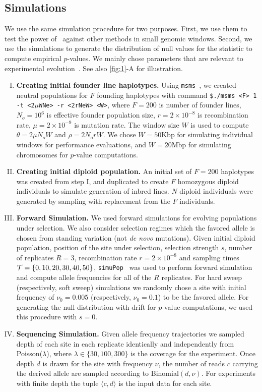 \subsection{Simulations}\label{sec:sims}
We use the same simulation procedure for two purposes. First, we use
them to test the power of \comale\ against other methods in small
genomic windows. Second, we use the simulations to generate the
distribution of null values for the statistic to compute empirical
$p$-values. We mainly chose parameters that are relevant to \dmel
experimental evolution~\cite{kofler2013guide}. See also \ref{fig:1}-A
for illustration. 
\begin{enumerate}[I.]
\item {\bf Creating initial founder line haplotypes.} Using
  \texttt{msms}~\cite{ewing2010msms}, we created neutral populations
  for $F$ founding haplotypes with command \texttt{\$./msms <F> 1 -t
    <2$\mu$WNe> -r <2rNeW> <W>}, where $F=200$ is number of founder
  lines, $N_o=10^6$ is effective founder population size,
  $r=2\times10^{-8}$ is recombination rate, $\mu=2\times 10^{-9}$ is
  mutation rate. The window size $W$ is used to compute $\theta=2\mu
  N_oW$ and $\rho=2N_orW$. We chose $W=50$Kbp for simulating
  individual windows for performance evaluations, and $W=20$Mbp for
  simulating \dmel chromosomes for $p$-value computations.
  
\item{\bf Creating initial diploid population.} An initial set of
  $F=200$ haplotypes was created from step I, and duplicated to create
  $F$ homozygous diploid individuals to simulate generation of inbred
  lines. $N$ diploid individuals were generated by sampling with
  replacement from the $F$ individuals.

\item{\bf Forward Simulation.} We used forward simulations for
  evolving populations under selection. We also consider selection
  regimes which the favored allele is chosen from standing variation
  (not \emph{de novo} mutations). Given initial diploid population,
  position of the site under selection, selection strength $s$, number
  of replicates $R=3$, recombination rate $r=2\times10^{-8}$ and
  sampling times ${\cal T}=\{0,10,20,30,40,50\}$,
  \texttt{simuPop}~\cite{peng2005simupop} was used to perform forward
  simulation and compute allele frequencies for all of the $R$
  replicates.  For hard sweep (respectively, soft sweep) simulations
  we randomly chose a site with initial frequency of $\nu_0=0.005$
  (respectively, $\nu_0=0.1$) to be the favored allele. For generating
  the null distribution with drift for $p$-value computations, we used
  this procedure with $s=0$.

\item{\bf Sequencing Simulation.} Given allele frequency trajectories
  we sampled depth of each site in each replicate identically and
  independently from Poisson($\lambda$), where $\lambda \in
  \{30,100,300\}$ is the coverage for the experiment. Once depth $d$
  is drawn for the site with frequency $\nu$, the number of reads $c$
  carrying the derived allele are sampled according to
  Binomial$(d,\nu)$. For experiments with finite depth the tuple
  $\langle c,d\rangle$ is the input data for each site.
\end{enumerate}
